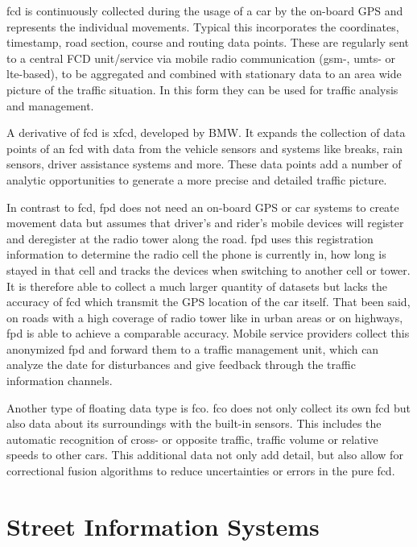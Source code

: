\documentclass[a4paper,headsepline,footsepline,fontsize=11pt,BCOR=12mm,DIV=12]{report}
\begin{document}
\acrfull{fcd} is continuously collected during the usage of a car by the on-board GPS and represents the individual movements. Typical this incorporates the coordinates, timestamp, road section, course and routing data points. These are regularly sent to a central FCD unit/service via mobile radio communication (\acrshort{gsm}-, \acrshort{umts}- or \acrshort{lte}-based), to be aggregated and combined with stationary data to an area wide picture of the traffic situation. In this form they can be used for traffic analysis and management. \cite{Randelhoff2016,LAPID2020}

A derivative of \acrshort{fcd} is \acrfull{xfcd}, developed by BMW. It expands the collection of data points of an \acrshort{fcd} with data from the vehicle sensors and systems like breaks, rain sensors, driver assistance systems and more. These data points add a number of analytic opportunities to generate a more precise and detailed traffic picture. \cite{LAPID2020}

In contrast to \acrshort{fcd}, \acrlong{fpd} does not need an on-board GPS or car systems to create movement data but assumes that driver’s and rider’s mobile devices will register and deregister at the radio tower along the road. \acrshort{fpd} uses this registration information to determine the radio cell the phone is currently in, how long is stayed in that cell and tracks the devices when switching to another cell or tower. It is therefore able to collect a much larger quantity of datasets but lacks the accuracy of \acrshort{fcd} which transmit the GPS location of the car itself. That been said, on roads with a high coverage of radio tower like in urban areas or on highways, \acrshort{fpd} is able to achieve a comparable accuracy. Mobile service providers collect this anonymized \acrshort{fpd} and forward them to a traffic management unit, which can analyze the date for disturbances and give feedback through the traffic information channels. \cite{Randelhoff2016,LAPID2020}

Another type of floating data type is \acrfull{fco}. \acrshort{fco} does not only collect its own \acrshort{fcd} but also data about its surroundings with the built-in sensors. This includes the automatic recognition of cross- or opposite traffic, traffic volume or relative speeds to other cars. This additional data not only add detail, but also allow for correctional fusion algorithms to reduce uncertainties or errors in the pure \acrshort{fcd}. \cite{Randelhoff2016}

\section{Street Information Systems}
\end{document}
